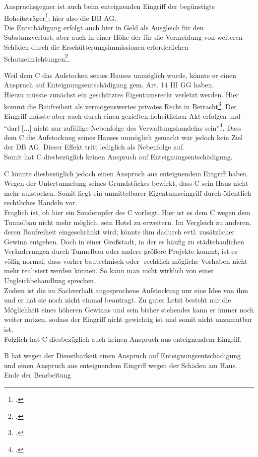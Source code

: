 \documentclass[widefront, ngerman]{jura}
\begin{document}
Anspruchsgegner ist auch beim enteignenden Eingriff der begünstigte Hoheitsträger\footcite[Rn 1175, 1159]{detterbeckVerwR}; hier also die DB AG.\\
Die Entschädigung erfolgt auch hier in Geld als Ausgleich für den Substanzverlust; aber auch in einer Höhe der für die Vermeidung von weiteren Schäden durch die Erschütterungsimmissionen erforderlichen Schutzeinrichtungen\footcite[§17 Rn 73]{DetterbeckStaatshaftung}.

\levelup
\levelup{}

Weil dem C das Aufstocken seines Hauses unmöglich wurde, könnte er einen Anspruch auf Enteignungsentschädigung gem. Art. 14 III GG haben.\\
Hierzu müsste zunächst ein geschütztes Eigentumsrecht verletzt werden. Hier kommt die Baufreiheit als vermögenswertes privates Recht in Betracht\footcite[S. 183]{Schulze}. Der Eingriff müsste aber auch durch einen gezielten hoheitlichen Akt erfolgen und "`darf [...] nicht nur zufällige Nebenfolge des Verwaltungshandelns sein"'\footcite[§16 Rn 125]{DetterbeckStaatshaftung}. Dass dem C die Aufstockung seines Hauses unmöglich gemacht war jedoch kein Ziel der DB AG. Dieser Effekt tritt lediglich als Nebenfolge auf.\\
Somit hat C diesbezüglich keinen Anspruch auf Enteignungsentschädigung.

C könnte diesbezüglich jedoch einen Anspruch aus enteignendem Eingriff haben.\\
Wegen der Untertunnelung seines Grundstückes bewirkt, dass C sein Haus nicht mehr aufstocken. Somit liegt ein unmittelbarer Eigentumseingriff durch öffentlich-rechtliches Handeln vor.\\
Fraglich ist, ob hier ein Sonderopfer des C vorliegt.
Hier ist es dem C wegen dem Tunnelbau nicht mehr möglich, sein Hotel zu erweitern. Im Vergleich zu anderen, deren Baufreiheit eingeschränkt wird; könnte ihm dadurch evtl. zusätzlicher Gewinn entgehen. Doch in einer Großstadt, in der es häufig zu städtebaulichen Veränderungen durch Tunnelbau oder andere größere Projekte kommt, ist es völlig normal, dass vorher bautechnisch oder -rechtlich mögliche Vorhaben nicht mehr realisiert werden können. So kann man nicht wirklich von einer Ungleichbehandlung sprechen.\\
Zudem ist die im Sachverhalt angesprochene Aufstockung nur eine Idee von ihm und er hat sie noch nicht einmal beantragt. Zu guter Letzt besteht nur die Möglichkeit eines höheren Gewinns und sein bisher stehendes kann er immer noch weiter nutzen, sodass der Eingriff nicht gewichtig ist und somit nicht unzumutbar ist.\\
Folglich hat C diesbezüglich auch keinen Anspruch aus enteignendem Eingriff.



\levelup{}
B hat wegen der Dienstbarkeit einen Anspruch auf Enteignungsentschädigung und einen Anspruch aus enteignendem Eingriff wegen der Schäden am Haus.
\\
\linebreak
\bigskip 
Ende der Bearbeitung
\end{document}
